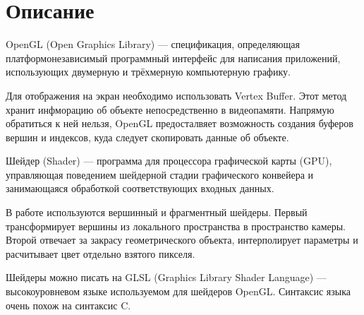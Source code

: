 \section{Описание}
OpenGL (Open Graphics Library) --- спецификация, определяющая платформонезависимый программный интерфейс для написания приложений, использующих двумерную и трёхмерную компьютерную графику.

Для отображения на экран необходимо использовать Vertex Buffer. Этот метод хранит инфморацию об объекте непосредственно в видеопамяти. Напрямую обратиться к ней нельзя, OpenGL предосталвяет возможность создания буферов вершин и индексов, куда следует скопировать данные об объекте.

Шейдер (Shader) --- программа для процессора графической карты (GPU), управляющая поведением шейдерной стадии графического конвейера и занимающаяся обработкой соответствующих входных данных.

В работе используются вершинный и фрагментный шейдеры. Первый трансформирует вершины из локального пространства в пространство камеры. Второй отвечает за закрасу геометрического объекта, интерполирует параметры и расчитывает цвет отдельно взятого пикселя.

Шейдеры можно писать на GLSL (Graphics Library Shader Language) --- высокоуровневом языке используемом для шейдеров OpenGL. Синтаксис языка очень похож на синтаксис C.
\pagebreak
